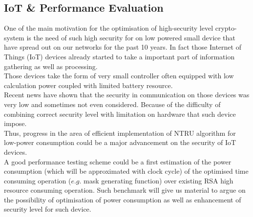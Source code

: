 \subsection{IoT \& Performance Evaluation}
One of the main motivation for the optimisation of high-security level crypto-system is the need of such high security for on low powered small device that have spread out on our networks for the past 10 years. In fact those Internet of Things (IoT) devices already started to take a important part of information gathering as well as processing.\\
Those devices take the form of very small controller often equipped with low calculation power coupled with limited battery resource.\\
Recent news have shown that the security in communication on those devices was very low and sometimes not even considered. Because of the difficulty of combining correct security level with limitation on hardware that such device impose.\\
Thus, progress in the area of efficient implementation of NTRU algorithm for low-power consumption could be a major advancement on the security of IoT devices.
\\A good performance testing scheme could be a first estimation of the power consumption (which will be approximated with clock cycle) of the optimised time consuming operation ($e.g.$ mask generating function) over existing RSA high resource consuming operation. Such benchmark will give us material to argue on the possibility of optimisation of power consumption as well as  enhancement of security level for such device.

